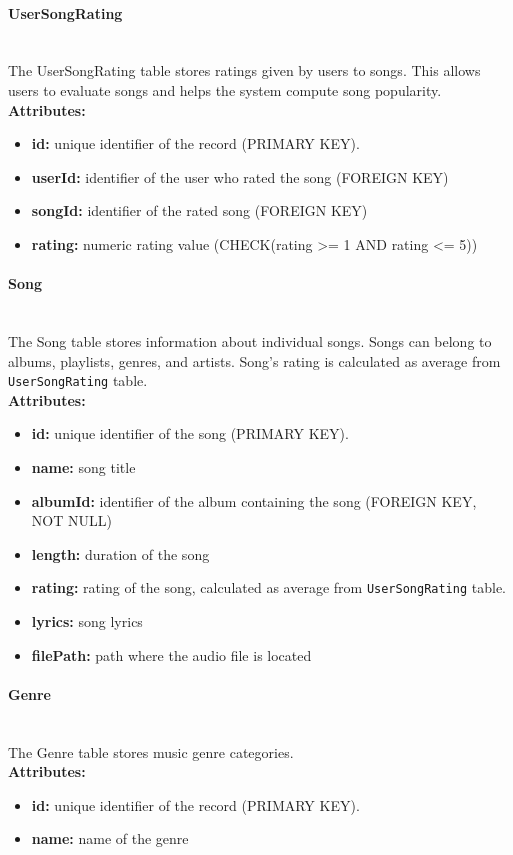 \documentclass[11pt, a4paper]{article}
\begin{document}
\paragraph{UserSongRating}~\\
The UserSongRating table stores ratings given by users to songs. This allows users to evaluate songs and helps the system compute song popularity.
~\\\textbf{Attributes:}
\begin{itemize}
    \item \textbf{id:} unique identifier of the record (PRIMARY KEY).
    \item \textbf{userId:} identifier of the user who rated the song (FOREIGN KEY)
    \item \textbf{songId:} identifier of the rated song (FOREIGN KEY)
    \item \textbf{rating:} numeric rating value (CHECK(rating >= 1 AND rating <= 5))
\end{itemize}

\paragraph{Song}~\\
The Song table stores information about individual songs. Songs can belong to albums, playlists, genres, and artists. Song's rating is calculated as average from \texttt{UserSongRating} table.
~\\\textbf{Attributes:}
\begin{itemize}
    \item \textbf{id:} unique identifier of the song (PRIMARY KEY).
    \item \textbf{name:} song title
    \item \textbf{albumId:} identifier of the album containing the song (FOREIGN KEY, NOT NULL)
    \item \textbf{length:} duration of the song
    \item \textbf{rating:} rating of the song, calculated as average from \texttt{UserSongRating} table.
    \item \textbf{lyrics:} song lyrics
    \item \textbf{filePath:} path where the audio file is located
\end{itemize}

\paragraph{Genre}~\\
The Genre table stores music genre categories.
~\\\textbf{Attributes:}
\begin{itemize}
    \item \textbf{id:} unique identifier of the record (PRIMARY KEY).
    \item \textbf{name:} name of the genre
\end{itemize}
\end{document}
